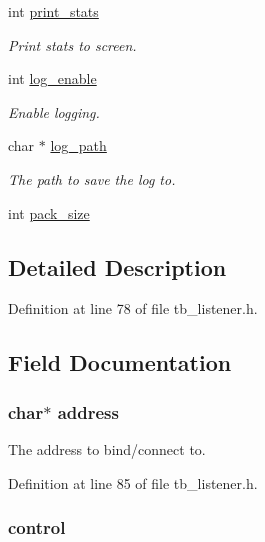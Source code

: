 \begin{DoxyCompactItemize}
int \hyperlink{structtb__test__params__t_a21a0be842e8fa2c780fa87f45bd5d17e}{print\-\_\-stats}
\begin{DoxyCompactList}\small\item\em Print stats to screen. \end{DoxyCompactList}\item 
int \hyperlink{structtb__test__params__t_ac5bfaec8717601161bb642175e1d85e0}{log\-\_\-enable}
\begin{DoxyCompactList}\small\item\em Enable logging. \end{DoxyCompactList}\item 
char $\ast$ \hyperlink{structtb__test__params__t_ac0ddb52991004ce37e7ef093186f44a1}{log\-\_\-path}
\begin{DoxyCompactList}\small\item\em The path to save the log to. \end{DoxyCompactList}\item 
int \hyperlink{structtb__test__params__t_af7112fe07fe05134febc994e10196ce5}{pack\-\_\-size}
\end{DoxyCompactItemize}


\subsection{Detailed Description}


Definition at line 78 of file tb\-\_\-listener.\-h.



\subsection{Field Documentation}
\hypertarget{structtb__test__params__t_a879a8cdf605d02f8af8b2e216b8764f2}{
\subsubsection[{address}]{\setlength{\rightskip}{0pt plus 5cm}char$\ast$ address}}\label{structtb__test__params__t_a879a8cdf605d02f8af8b2e216b8764f2}


The address to bind/connect to. 



Definition at line 85 of file tb\-\_\-listener.\-h.

\hypertarget{structtb__test__params__t_a50b4d1da7c10bfd1e9365a1c37d09442}{
\subsubsection[{control}]{ control}}\label{structtb__test__params__t_a50b4d1da7c10bfd1e9365a1c37d09442}


